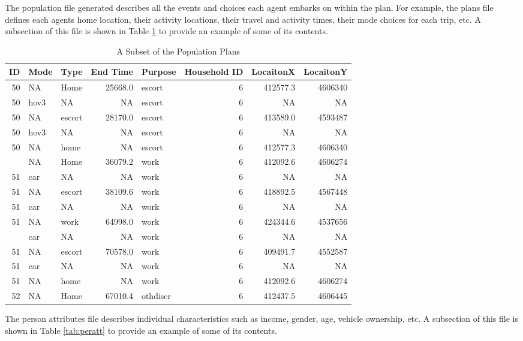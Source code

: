 \documentclass[3p, authoryear, review]{elsarticle} %
\begin{document}
The population file generated describes all the events and choices each agent embarks on within the plan. For example, the plans file defines each agents home location, their activity locations, their travel and activity times, their mode choices for each trip, etc. A subsection of this file is shown in Table \ref{tab:plans} to provide an example of some of its contents.

\begin{table}

\caption{\label{tab:plans}A Subset of the Population Plans}
\centering
\begin{tabular}[t]{rllrlrrr}
\toprule
ID & Mode & Type & End Time & Purpose & Household ID & LocaitonX & LocaitonY\\
\midrule
50 & NA & Home & 25668.0 & escort & 6 & 412577.3 & 4606340\\
50 & hov3 & NA & NA & escort & 6 & NA & NA\\
50 & NA & escort & 28170.0 & escort & 6 & 413589.0 & 4593487\\
50 & hov3 & NA & NA & escort & 6 & NA & NA\\
50 & NA & home & NA & escort & 6 & 412577.3 & 4606340\\
\addlinespace
51 & NA & Home & 36079.2 & work & 6 & 412092.6 & 4606274\\
51 & car & NA & NA & work & 6 & NA & NA\\
51 & NA & escort & 38109.6 & work & 6 & 418892.5 & 4567448\\
51 & car & NA & NA & work & 6 & NA & NA\\
51 & NA & work & 64998.0 & work & 6 & 424344.6 & 4537656\\
\addlinespace
51 & car & NA & NA & work & 6 & NA & NA\\
51 & NA & escort & 70578.0 & work & 6 & 409491.7 & 4552587\\
51 & car & NA & NA & work & 6 & NA & NA\\
51 & NA & home & NA & work & 6 & 412092.6 & 4606274\\
52 & NA & Home & 67010.4 & othdiscr & 6 & 412437.5 & 4606445\\
\bottomrule
\end{tabular}
\end{table}

The person attributes file describes individual characteristics such as income, gender, age, vehicle ownership, etc. A subsection of this file is shown in Table \ref{tab:peratt} to provide an example of some of its contents.
\end{document}

